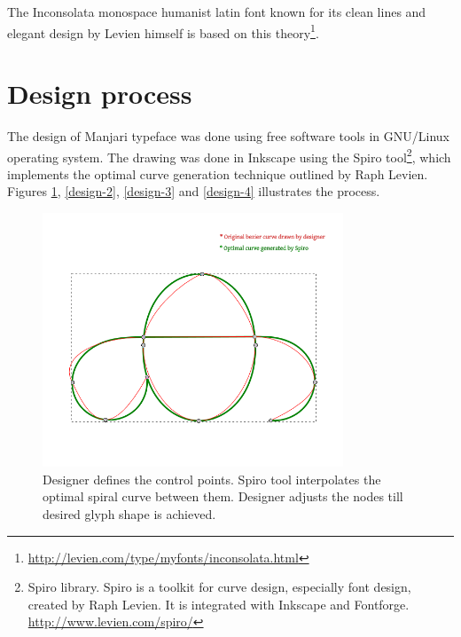 \documentclass[11pt,twoside,a4paper,parskip=half]{scrartcl}
\begin{document}
The Inconsolata monospace humanist latin font known for its clean lines and elegant design by Levien himself is based on this theory\footnote{\url{http://levien.com/type/myfonts/inconsolata.html}}.

\clearpage

\section{Design process}

The design of Manjari typeface was done using free software tools in GNU/Linux operating system. The drawing was done in Inkscape using the Spiro tool\footnote{Spiro library. Spiro is a toolkit for curve design, especially font design, created by Raph Levien. It is integrated with Inkscape and Fontforge. \url{http://www.levien.com/spiro/}}, which implements the optimal curve generation technique outlined by Raph Levien. Figures \ref{design-1}, \ref{design-2}, \ref{design-3} and \ref{design-4} illustrates the process.

\begin{figure}[h!]
	\includegraphics[width=0.8\textwidth]{images/design-1-spiral.png}
	\caption{Designer defines the control points. Spiro tool interpolates the optimal spiral curve between them. Designer adjusts the nodes till desired glyph shape is achieved.}
	\label{design-1}
\end{figure}
\end{document}

